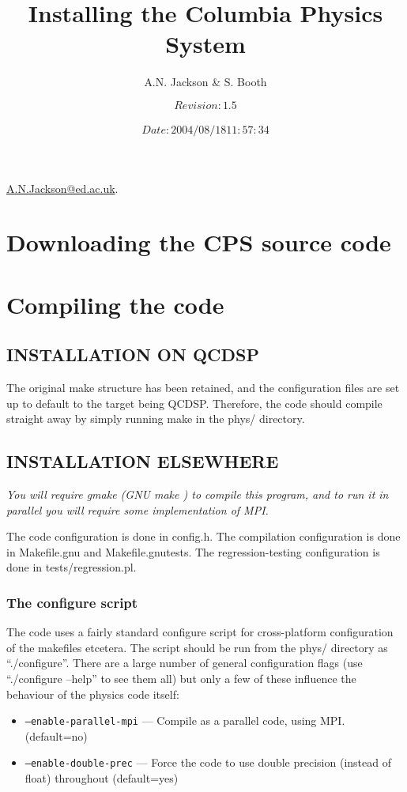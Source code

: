 \documentclass[12pt]{article}
\title{Installing the Columbia Physics System}
\author{A.N. Jackson \& S. Booth}
\date{\mbox{\small $$Revision: 1.5 $$  $$Date: 2004/08/18 11:57:34 $$}}
\begin{document}
\maketitle

\begin{flushright}
\href{mailto:A.N.Jackson@ed.ac.uk}{A.N.Jackson@ed.ac.uk}.
\end{flushright}

\tableofcontents

\newpage

\section{Downloading the CPS source code}

\section{Compiling the code}

\subsection{INSTALLATION ON QCDSP} 
The original make structure has been retained, and the configuration
files are set up to default to the target being QCDSP.  Therefore, the
code should compile straight away by simply running make in the phys/
directory.


\subsection{INSTALLATION ELSEWHERE}

{\large \emph{You will require gmake (GNU make ) to compile this program, and to
run it in parallel you will require some implementation of MPI.} }

The code configuration is done in config.h. The compilation
configuration is done in Makefile.gnu and Makefile.gnutests.  The
regression-testing configuration is done in tests/regression.pl.

\subsubsection{The configure script}
The code uses a fairly standard configure script for cross-platform
configuration of the makefiles etcetera.  The script should be run from the
phys/ directory as ``./configure''.  There are a large number of general
configuration flags (use ``./configure --help'' to see them all) but only a
few of these influence the behaviour of the physics code itself:
\begin{itemize}
 \item{\tt --enable-parallel-mpi} --- Compile as a parallel code, using MPI. (default=no) 
 \item{\tt --enable-double-prec} --- Force the code to use double precision (instead of float) throughout (default=yes) 
\end{itemize}
\end{document}
